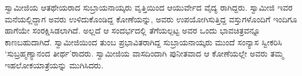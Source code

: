 ಸ್ವಾಮೀಜಿಯ ಆತಥೇಯರಾದ ಸುಬ್ರಾಯನಾಯ್ಕರು ವೃತ್ತಿಯಿಂದ ಆಯುರ್ವೇದ ವೈದ್ಯ ರಾಗಿದ್ದರು. ಸ್ವಾಮೀಜಿ ಇವರ ಮನೆಯಲ್ಲಿದ್ದಾಗ ಅವರು ಉಳಿದುಕೊಂಡಿದ್ದ ಕೋಣೆಯನ್ನು, ಅವರು ಉಪಯೋಗಿಸುತ್ತಿದ್ದ ವಸ್ತುಗಳೊಂದಿಗೆ ಇಂದಿಗೂ ಹಾಗೆಯೇ ಸಂರಕ್ಷಿಸಿಡಲಾಗಿದೆ. ಅಲ್ಲದೆ ಆ ಸಂದರ್ಭದಲ್ಲಿ ತೆಗೆಯಲ್ಪಟ್ಟ ಅವರ ಒಂದು ಭಾವಚಿತ್ರವನ್ನೂ ಕಾಣಬಹುದಾಗಿದೆ. ಸ್ವಾಮೀಜಿಯಿಂದ ತುಂಬ ಪ್ರಭಾವಿತರಾಗಿದ್ದ ಸುಬ್ರಾಯನಾಯ್ಕರು ಮುಂದೆ ಸಂನ್ಯಾಸ ಸ್ವೀಕರಿಸಿ ‘ಸುಬ್ರಹ್ಮಣ್ಯಾನಂದ ತೀರ್ಥ’ರಾದರು. ಸ್ವಾಮೀಜಿಯ ವಾಸದಿಂದಾಗಿ ಪುನೀತವಾದ ಆ ಕೋಣೆಯಲ್ಲೇ ಅವರು ತಮ್ಮ ಇಹಲೋಕಯಾತ್ರೆಯನ್ನು ಮುಗಿಸಿದರು.

